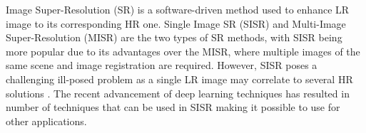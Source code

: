 \documentclass[conference]{IEEEtran}
\begin{document}

Image Super-Resolution (SR) is a software-driven method used to enhance LR image to its corresponding HR one. Single Image SR (SISR) and Multi-Image Super-Resolution (MISR) are the two types of SR methods, with SISR being more popular due to its advantages over the MISR, where multiple images of the same scene and image registration are required. However, SISR poses a challenging ill-posed problem as a single LR image may correlate to several HR solutions \cite{SISR}. The recent advancement of deep learning techniques has resulted in number of techniques that can be used in SISR making it possible to use for other applications.
\end{document}
